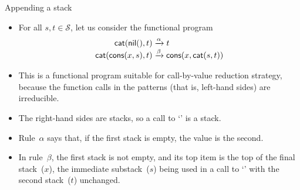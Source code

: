 %
\begin{frame}{Appending a stack}

  \begin{itemize}

    \item For all \(s, t \in \mathcal{S}\), let us consider the
      functional program
      \begin{align*}
        \textsf{cat}(\textsf{nil}(),t) &\xrightarrow{\alpha} t\\
        \textsf{cat}(\textsf{cons}(x,s),t) &\xrightarrow{\smash\beta}
        \textsf{cons}(x,\textsf{cat}(s,t))
      \end{align*}

    \item This is a functional program suitable for
      call\hyp{}by\hyp{}value reduction strategy, because the function
      calls in the patterns (that is, left\hyp{}hand sides) are
      irreducible.

    \item The right\hyp{}hand sides are stacks, so a call to
      `' is a stack.

    \item Rule~\(\alpha\) says that, if the first stack is empty, the
      value is the second.

    \item In rule~\(\beta\), the first stack is not empty, and its top
      item is the top of the final stack~(\(x\)), the immediate
      substack~(\(s\)) being used in a call to `' with the
      second stack~(\(t\)) unchanged.

  \end{itemize}

\end{frame}

